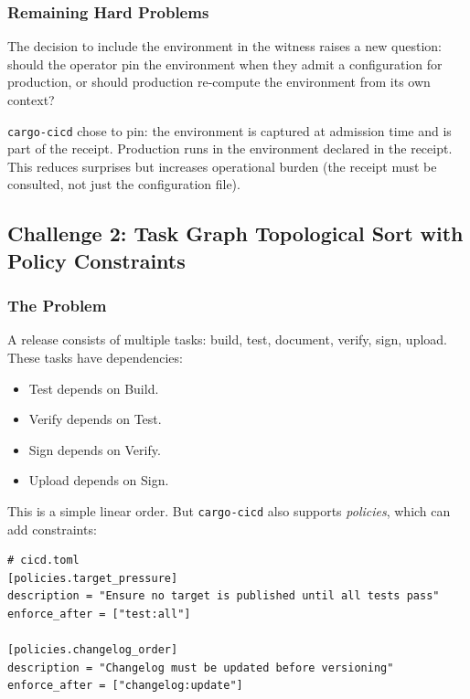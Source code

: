\subsubsection{Remaining Hard Problems}

The decision to include the environment in the witness raises a new question: should the operator pin the environment when they admit a configuration for production, or should production re-compute the environment from its own context?

\texttt{cargo-cicd} chose to pin: the environment is captured at admission time and is part of the receipt. Production runs in the environment declared in the receipt. This reduces surprises but increases operational burden (the receipt must be consulted, not just the configuration file).

\subsection{Challenge 2: Task Graph Topological Sort with Policy Constraints}

\subsubsection{The Problem}

A release consists of multiple tasks: build, test, document, verify, sign, upload. These tasks have dependencies:

\begin{itemize}
  \item Test depends on Build.
  \item Verify depends on Test.
  \item Sign depends on Verify.
  \item Upload depends on Sign.
\end{itemize}

This is a simple linear order. But \texttt{cargo-cicd} also supports \emph{policies}, which can add constraints:

\begin{lstlisting}[caption={Policy-imposed constraints on task order}]
# cicd.toml
[policies.target_pressure]
description = "Ensure no target is published until all tests pass"
enforce_after = ["test:all"]

[policies.changelog_order]
description = "Changelog must be updated before versioning"
enforce_after = ["changelog:update"]
\end{lstlisting}

